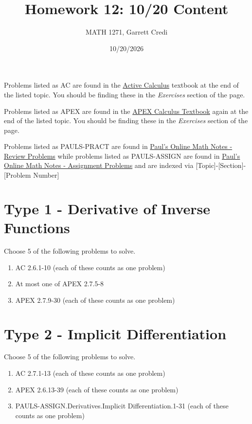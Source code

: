 \documentclass[12pt]{article}
\title{Homework 12: 10/20 Content}
\author{MATH 1271, Garrett Credi}
\date{10/20/2026}
\begin{document}
\maketitle

Problems listed as AC are found in the \href{https://activecalculus.org/single1e/frontmatter.html}{Active Calculus} 
textbook at the end of the listed topic. You should be finding these in the \textit{Exercises} section of the page.

Problems listed as APEX are found in the \href{https://opentext.uleth.ca/apex-calculus/apex-calculus.html}{APEX Calculus Textbook}
again at the end of the listed topic. You should be finding these in the \textit{Exercises} section of the page.

Problems listed as PAULS-PRACT are found in \href{https://tutorial.math.lamar.edu/Problems/CalcI/CalcI.aspx}{Paul's Online Math Notes - Review Problems}
while problems listed as PAULS-ASSIGN are found in \href{https://tutorial.math.lamar.edu/ProblemsNS/CalcI/CalcI.aspx}{Paul's Online Math Notes - Assignment Problems}
and are indexed via [Topic]-[Section]-[Problem Number]

\section{Type 1 - Derivative of Inverse Functions}
Choose 5 of the following problems to solve.

\begin{enumerate}
  \item AC 2.6.1-10 (each of these counts as one problem)
  \item At most one of APEX 2.7.5-8
  \item APEX 2.7.9-30 (each of these counts as one problem)
\end{enumerate}

\section{Type 2 - Implicit Differentiation}
Choose 5 of the following problems to solve.

\begin{enumerate}
  \item AC 2.7.1-13 (each of these counts as one problem)
  \item APEX 2.6.13-39 (each of these counts as one problem)
  \item PAULS-ASSIGN.Derivatives.Implicit Differentiation.1-31 (each of these counts as one problem)
\end{enumerate}
\end{document}
